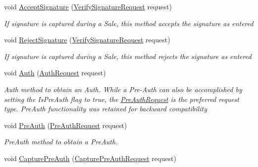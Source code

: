 \begin{DoxyCompactItemize}
void \hyperlink{classcom_1_1clover_1_1remotepay_1_1sdk_1_1_clover_connector_a2d54a7e1d05451c3335fe31337a56ea4}{Accept\+Signature} (\hyperlink{classcom_1_1clover_1_1remotepay_1_1sdk_1_1_verify_signature_request}{Verify\+Signature\+Request} request)
\begin{DoxyCompactList}\small\item\em If signature is captured during a Sale, this method accepts the signature as entered \end{DoxyCompactList}\item 
void \hyperlink{classcom_1_1clover_1_1remotepay_1_1sdk_1_1_clover_connector_a8a86e1d3994b81424b06e0846f52dc29}{Reject\+Signature} (\hyperlink{classcom_1_1clover_1_1remotepay_1_1sdk_1_1_verify_signature_request}{Verify\+Signature\+Request} request)
\begin{DoxyCompactList}\small\item\em If signature is captured during a Sale, this method rejects the signature as entered \end{DoxyCompactList}\item 
void \hyperlink{classcom_1_1clover_1_1remotepay_1_1sdk_1_1_clover_connector_a2ae641aff3f22e4c5fa651d8deaa7bbd}{Auth} (\hyperlink{classcom_1_1clover_1_1remotepay_1_1sdk_1_1_auth_request}{Auth\+Request} request)
\begin{DoxyCompactList}\small\item\em Auth method to obtain an Auth. While a Pre-\/\+Auth can also be accomplished by setting the Is\+Pre\+Auth flag to true, the \hyperlink{classcom_1_1clover_1_1remotepay_1_1sdk_1_1_pre_auth_request}{Pre\+Auth\+Request} is the preferred request type. Pre\+Auth functionality was retained for backward compatibility \end{DoxyCompactList}\item 
void \hyperlink{classcom_1_1clover_1_1remotepay_1_1sdk_1_1_clover_connector_ab770dbea796bfc3ffa1d0ed999d04b48}{Pre\+Auth} (\hyperlink{classcom_1_1clover_1_1remotepay_1_1sdk_1_1_pre_auth_request}{Pre\+Auth\+Request} request)
\begin{DoxyCompactList}\small\item\em Pre\+Auth method to obtain a Pre\+Auth. \end{DoxyCompactList}\item 
void \hyperlink{classcom_1_1clover_1_1remotepay_1_1sdk_1_1_clover_connector_a7323abfe34b1fee5634dd7e1296633cb}{Capture\+Pre\+Auth} (\hyperlink{classcom_1_1clover_1_1remotepay_1_1sdk_1_1_capture_pre_auth_request}{Capture\+Pre\+Auth\+Request} request)

\end{DoxyCompactItemize}
